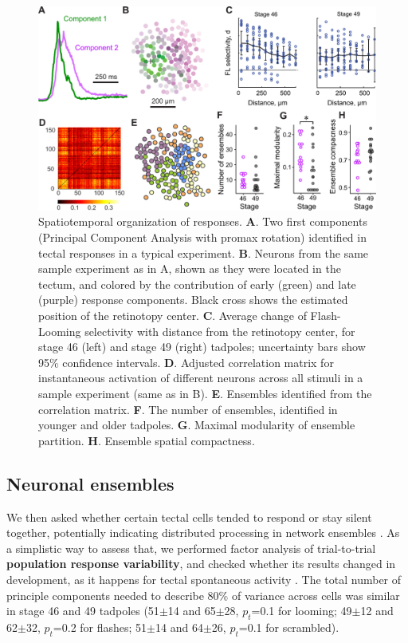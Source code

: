 \documentclass{article}
\begin{document}
\begin{figure}[t!]
\includegraphics[width=\linewidth]{fig3.pdf}
\caption{
Spatiotemporal organization of responses. \textbf{A}. Two first components (Principal Component Analysis with promax rotation) identified in tectal responses in a typical experiment.  \textbf{B}. Neurons from the same sample experiment as in A, shown as they were located in the tectum, and colored by the contribution of early (green) and late (purple) response components. Black cross shows the estimated position of the retinotopy center. \textbf{C}. Average change of Flash-Looming selectivity with distance from the retinotopy center, for stage 46 (left) and stage 49 (right) tadpoles; uncertainty bars show 95\% confidence intervals. \textbf{D}. Adjusted correlation matrix for instantaneous activation of different neurons across all stimuli in a sample experiment (same as in B). \textbf{E}. Ensembles identified from the correlation matrix. \textbf{F}. The number of ensembles, identified in younger and older tadpoles. \textbf{G}. Maximal modularity of ensemble partition. \textbf{H}. Ensemble spatial compactness.}
\end{figure}

\subsection*{Neuronal ensembles}

We then asked whether certain tectal cells tended to respond or stay silent together, potentially indicating distributed processing in network ensembles \citep{orger2016review}. As a simplistic way to assess that, we performed factor analysis of trial-to-trial \textbf{population response variability}, and checked whether its results changed in development, as it happens for tectal spontaneous activity \citep{xu2011}. The total number of principle components needed to describe 80\% of variance across cells \citep{avitan2017spontaneous} was similar in stage 46 and 49 tadpoles (51$\pm$14 and 65$\pm$28, $p_t$=0.1 for looming; 49$\pm$12 and 62$\pm$32, $p_t$=0.2 for flashes; 51$\pm$14 and 64$\pm$26, $p_t$=0.1 for scrambled).
\end{document}
